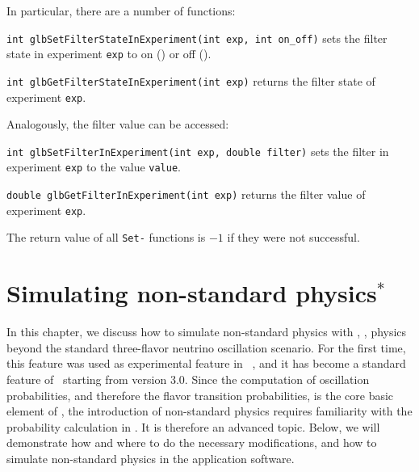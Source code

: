 In particular, there are a number of functions:
\begin{function}
{\tt int glbSetFilterStateInExperiment(int exp, int on\_off)} sets the filter state in experiment {\tt exp} to on () or off ().
\end{function}
\begin{function}
{\tt int glbGetFilterStateInExperiment(int exp)} returns the filter state of experiment {\tt exp}.
\end{function}
Analogously, the filter value can be accessed:
\begin{function}
{\tt int glbSetFilterInExperiment(int exp, double filter)} sets the filter  in experiment {\tt exp} to the value {\tt value}.
\end{function}
\begin{function}
{\tt double glbGetFilterInExperiment(int exp)} returns the filter value of experiment {\tt exp}.
\end{function}
The return value of all {\tt Set-} functions is $-1$ if they were not successful.

\chapter{Simulating non-standard physics$^*$}
\label{chapt:nsphysics}

In this chapter, we discuss how to simulate non-standard physics with \GLOBES , \ie, physics
beyond the standard three-flavor neutrino oscillation scenario. For the first time, this feature was used as experimental 
feature in \Ref~\cite{Blennow:2005yk},
and it has become a standard feature of \GLOBES\ starting from version 3.0. Since the 
computation of oscillation probabilities, and therefore the flavor transition probabilities, is the core basic
element of \GLOBES , the introduction of non-standard physics requires familiarity with the
probability calculation in \GLOBES . It is therefore an advanced topic.
Below, we will demonstrate how and where to do the necessary modifications, and how to simulate non-standard
physics in the application software.

